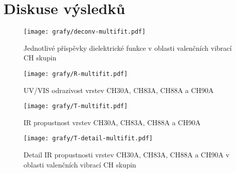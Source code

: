 \chapter{Diskuse výsledků}

\begin{figure}[ht]
	\texttt{[image: grafy/deconv-multifit.pdf]}
	\caption{Jednotlivé příspěvky dielektrické funkce v oblasti valenčních vibrací CH skupin}
\end{figure}

\begin{figure}[ht]
	\texttt{[image: grafy/R-multifit.pdf]}
	\caption{UV/VIS odrazivost vrstev CH30A, CH83A, CH88A a CH90A}
\end{figure}

\begin{figure}[ht]
	\texttt{[image: grafy/T-multifit.pdf]}
	\caption{IR propustnost vrstev CH30A, CH83A, CH88A a CH90A}
\end{figure}

\begin{figure}[ht]
	\texttt{[image: grafy/T-detail-multifit.pdf]}
	\caption{Detail IR propustnosti vrstev CH30A, CH83A, CH88A a CH90A v oblasti valenčních vibrací CH skupin}
\end{figure}

\cleardoublepage
